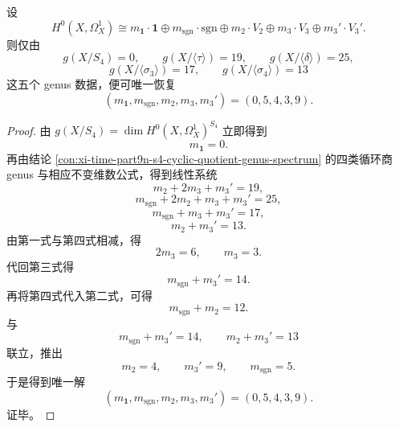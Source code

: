 \begin{conclusion}\label{con:xi-time-part9n-s4-quotient-genera-recover-multiplicities}
设
\[
H^0(X,\Omega_X^1)\cong
m_{\mathbf 1}\cdot \mathbf 1\oplus
m_{\mathrm{sgn}}\cdot \mathrm{sgn}\oplus
m_2\cdot V_2\oplus
m_3\cdot V_3\oplus
m_3'\cdot V_3'.
\]
则仅由
\[
g(X/S_4)=0,\qquad
g(X/\langle \tau\rangle)=19,\qquad
g(X/\langle \delta\rangle)=25,
\]
\[
g(X/\langle \sigma_3\rangle)=17,\qquad
g(X/\langle \sigma_4\rangle)=13
\]
这五个 genus 数据，便可唯一恢复
\[
(m_{\mathbf 1},m_{\mathrm{sgn}},m_2,m_3,m_3')=(0,5,4,3,9).
\]
\end{conclusion}
\begin{proof}
由 \(g(X/S_4)=\dim H^0(X,\Omega_X^1)^{S_4}\) 立即得到
\[
m_{\mathbf 1}=0.
\]
再由结论 \ref{con:xi-time-part9n-s4-cyclic-quotient-genus-spectrum} 的四类循环商 genus 与相应不变维数公式，得到线性系统
\[
m_2+2m_3+m_3'=19,
\]
\[
m_{\mathrm{sgn}}+2m_2+m_3+m_3'=25,
\]
\[
m_{\mathrm{sgn}}+m_3+m_3'=17,
\]
\[
m_2+m_3'=13.
\]
由第一式与第四式相减，得
\[
2m_3=6,\qquad m_3=3.
\]
代回第三式得
\[
m_{\mathrm{sgn}}+m_3'=14.
\]
再将第四式代入第二式，可得
\[
m_{\mathrm{sgn}}+m_2=12.
\]
与
\[
m_{\mathrm{sgn}}+m_3'=14,\qquad m_2+m_3'=13
\]
联立，推出
\[
m_2=4,\qquad m_3'=9,\qquad m_{\mathrm{sgn}}=5.
\]
于是得到唯一解
\[
(m_{\mathbf 1},m_{\mathrm{sgn}},m_2,m_3,m_3')=(0,5,4,3,9).
\]
证毕。
\end{proof}




